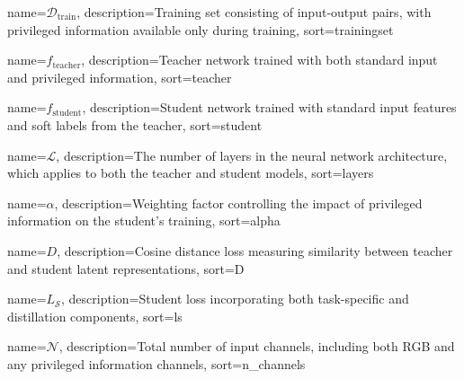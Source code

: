 {
    name=\(\mathcal{D}_{\text{train}}\),
    description={Training set consisting of input-output pairs, with privileged information available only during training},
    sort=trainingset
}

{
    name=\(f_{\text{teacher}}\),
    description={Teacher network trained with both standard input and privileged information},
    sort=teacher
}

{
    name=\(f_{\text{student}}\),
    description={Student network trained with standard input features and soft labels from the teacher},
    sort=student
}

{
    name=\(\mathcal{L}\),
    description={The number of layers in the neural network architecture, which applies to both the teacher and student models},
    sort=layers
}


{
    name=\(\alpha\),
    description={Weighting factor controlling the impact of privileged information on the student's training},
    sort=alpha
}

{
    name=\(D\),
    description={Cosine distance loss measuring similarity between teacher and student latent representations},
    sort=D
}

{
    name=\(L_{\mathcal{S}}\),
    description={Student loss incorporating both task-specific and distillation components},
    sort=ls
}

{
    name=\(\mathcal{N}\),
    description={Total number of input channels, including both RGB and any privileged information channels},
    sort=n_channels
}




